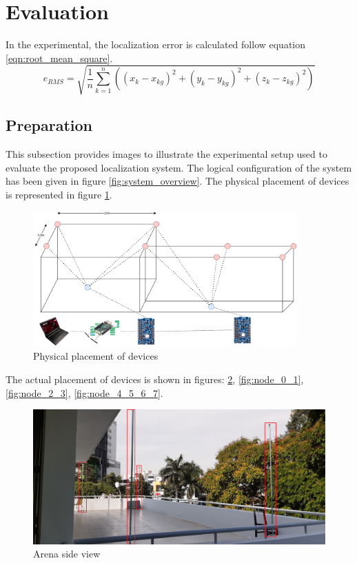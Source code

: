 \documentclass[\main/main.tex]{subfiles}
\begin{document}
\section{Evaluation}

In the experimental, the localization error is calculated follow equation \ref{eqn:root_mean_square}.
\begin{equation}
    e_{RMS} = \sqrt{\frac{1}{n} \sum_{k=1}^{n} ((x_k-x_{kg})^2 + (y_k-y_{kg})^2 + (z_k-z_{kg})^2)}
    \label{eqn:root_mean_square}
\end{equation}

\subsection{Preparation}
This subsection provides images to illustrate the experimental setup used to evaluate the proposed localization system. The logical configuration of the system has been given in figure \ref{fig:system_overview}. The physical placement of devices is represented in figure \ref{fig:physical placement of devices}.

\begin{figure}[H]     
    \centering
    \includegraphics[width=0.9\textwidth]{system_overview_phy.png}
    \caption{Physical placement of devices}
    \label{fig:physical placement of devices}
\end{figure}
The actual placement of devices is shown in figures: \ref{fig:arena_00}, \ref{fig:node_0_1}, \ref{fig:node_2_3}, \ref{fig:node_4_5_6_7}.

\begin{figure}[H]      
    \centering
    \includegraphics[width=1\textwidth]{arena_00.jpg}
    \caption{Arena side view}
    \label{fig:arena_00}
\end{figure}
\end{document}
